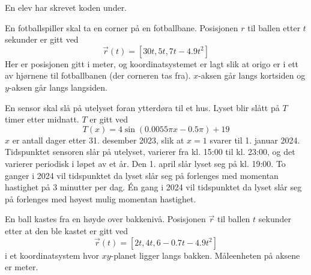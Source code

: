 \newpage
{}
En elev har skrevet koden under.

En fotballspiller skal ta en corner på en fotballbane. Posisjonen $r$
til ballen etter $t$ sekunder er gitt ved
\[ \vec{r}(t) = [30t, 5t, 7t - 4.9t^2] \]
Her er posisjonen gitt i meter, og koordinatsystemet er lagt slik at origo er i
ett av hjørnene til fotballbanen (der corneren tas fra). $x$-aksen går langs kortsiden og $y$-aksen går langs
langsiden.

\newpage
{}
En sensor skal slå på utelyset foran ytterdøra til et hus. Lyset blir slått på $T$
timer etter midnatt. $T$ er gitt ved
\[ T(x) = 4 \sin(0.0055\pi x - 0.5\pi) + 19 \]
$x$ er antall dager etter 31. desember 2023, slik at $x=1$ svarer til 1. januar 2024.
Tidspunktet sensoren slår på utelyset, varierer fra kl. 15:00 til kl. 23:00, og det
varierer periodisk i løpet av et år. Den 1. april slår lyset seg på kl. 19:00.
To ganger i 2024 vil tidspunktet da lyset slår seg på forlenges med momentan hastighet på 3 minutter per dag.
Én gang i 2024 vil tidspunktet da lyset slår seg på forlenges med høyest mulig momentan hastighet.

En ball kastes fra en høyde over bakkenivå. Posisjonen $\vec{r}$ til ballen $t$ sekunder etter at den ble kastet er gitt ved
\[
\vec{r}(t) = \left[2t, 4t, 6 - 0.7t - 4.9t^2 \right]
\]
i et koordinatsystem hvor $xy$-planet ligger langs bakken. Måleenheten på aksene er meter.

